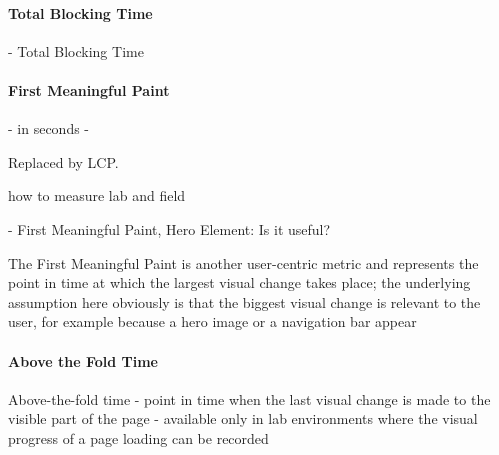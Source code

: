 

\paragraph{Total Blocking Time}



- Total Blocking Time






\paragraph{First Meaningful Paint}


- in seconds
-

Replaced by LCP.

how to measure lab and field


- First Meaningful Paint, Hero Element: Is it useful? 




The First Meaningful Paint is another user-centric metric and represents the point in time at which the largest visual change takes place; the underlying assumption here obviously is that the biggest visual change is relevant to the user, for example because a hero image or a navigation bar appear




\paragraph{Above the Fold Time}

Above-the-fold time 
- point in time when the last visual change is made to the visible part of the page
- available only in lab environments where the visual progress of a page loading can be recorded







